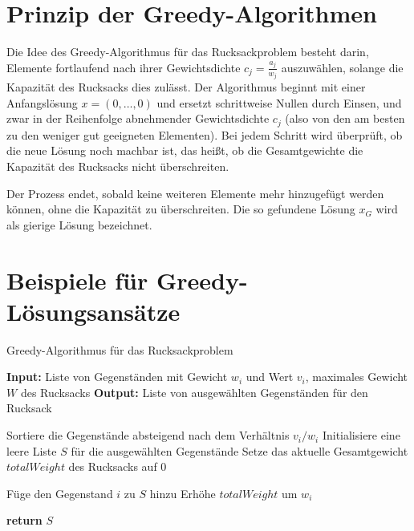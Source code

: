 \documentclass[12pt]{report}
\begin{document}
\section{Prinzip der Greedy-Algorithmen}
Die Idee des Greedy-Algorithmus für das Rucksackproblem besteht darin, Elemente fortlaufend nach ihrer Gewichtsdichte \( c_j = \frac{a_j}{w_j} \) auszuwählen, solange die Kapazität des Rucksacks dies zulässt. Der Algorithmus beginnt mit einer Anfangslösung \( x = (0, \ldots, 0) \) und ersetzt schrittweise Nullen durch Einsen, und zwar in der Reihenfolge abnehmender Gewichtsdichte \( c_j \) (also von den am besten zu den weniger gut geeigneten Elementen). Bei jedem Schritt wird überprüft, ob die neue Lösung noch machbar ist, das heißt, ob die Gesamtgewichte die Kapazität des Rucksacks nicht überschreiten.

Der Prozess endet, sobald keine weiteren Elemente mehr hinzugefügt werden können, ohne die Kapazität zu überschreiten. Die so gefundene Lösung \( x_G \) wird als gierige Lösung bezeichnet. \cite{diubin2003average}


\section{Beispiele für Greedy-Lösungsansätze}
\begin{algorithm}
	\caption{Greedy-Algorithmus für das Rucksackproblem}
	\begin{algorithmic}[1]
		\State \textbf{Input:} Liste von Gegenständen mit Gewicht $w_i$ und Wert $v_i$, maximales Gewicht $W$ des Rucksacks
		\State \textbf{Output:} Liste von ausgewählten Gegenständen für den Rucksack
		
		\State Sortiere die Gegenstände absteigend nach dem Verhältnis $v_i/w_i$
		\State Initialisiere eine leere Liste $S$ für die ausgewählten Gegenstände
		\State Setze das aktuelle Gesamtgewicht $totalWeight$ des Rucksacks auf $0$
		
		\State Füge den Gegenstand $i$ zu $S$ hinzu
		\State Erhöhe $totalWeight$ um $w_i$
		\EndIf
		\EndFor
		
		\State \textbf{return} $S$
	\end{algorithmic}
\end{algorithm}
\end{document}
